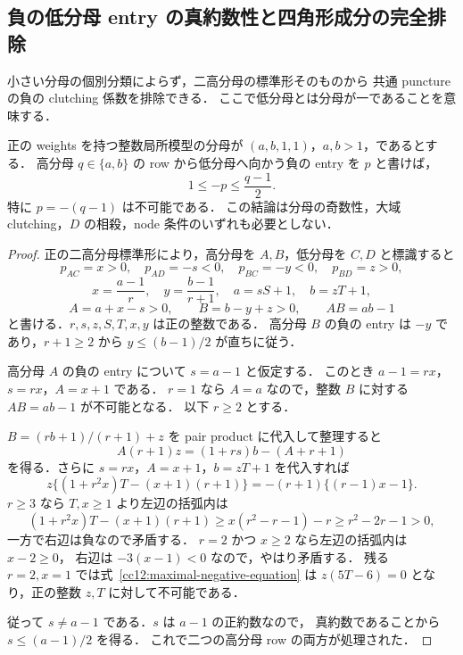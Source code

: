 
\subsection{負の低分母 entry の真約数性と四角形成分の完全排除}
\label{cc12:section}

小さい分母の個別分類によらず，二高分母の標準形そのものから
共通 puncture の負の clutching 係数を排除できる．
ここで低分母とは分母が一であることを意味する．

\begin{lemma}
\label{cc12:proper-negative}
正の weights を持つ整数局所模型の分母が $(a,b,1,1)$，$a,b>1$，であるとする．
高分母 $q\in\{a,b\}$ の row から低分母へ向かう負の entry を $p$ と書けば，
\[
 1\leq -p\leq\frac{q-1}{2}.
\]
特に $p=-(q-1)$ は不可能である．
この結論は分母の奇数性，大域 clutching，$D$ の相殺，node 条件のいずれも必要としない．
\end{lemma}

\begin{proof}
正の二高分母標準形により，高分母を $A,B$，低分母を $C,D$ と標識すると
\[
 p_{AC}=x>0,\quad p_{AD}=-s<0,\quad
 p_{BC}=-y<0,\quad p_{BD}=z>0,
\]
\[
 x=\frac{a-1}{r},\quad y=\frac{b-1}{r+1},\quad
 a=sS+1,\quad b=zT+1,
\]
\[
 A=a+x-s>0,\qquad B=b-y+z>0,\qquad AB=ab-1
\]
と書ける．$r,s,z,S,T,x,y$ は正の整数である．
高分母 $B$ の負の entry は $-y$ であり，$r+1\geq2$ から
$y\leq(b-1)/2$ が直ちに従う．

高分母 $A$ の負の entry について $s=a-1$ と仮定する．
このとき $a-1=rx$，$s=rx$，$A=x+1$ である．
$r=1$ なら $A=a$ なので，整数 $B$ に対する $AB=ab-1$ が不可能となる．
以下 $r\geq2$ とする．

$B=(rb+1)/(r+1)+z$ を pair product に代入して整理すると
\[
 A(r+1)z=(1+rs)b-(A+r+1)
\]
を得る．さらに $s=rx$，$A=x+1$，$b=zT+1$ を代入すれば
\begin{equation}\label{cc12:maximal-negative-equation}
 z\{(1+r^2x)T-(x+1)(r+1)\}
 =-(r+1)\{(r-1)x-1\}.
\end{equation}
$r\geq3$ なら $T,x\geq1$ より左辺の括弧内は
\[
 (1+r^2x)T-(x+1)(r+1)
 \geq x(r^2-r-1)-r
 \geq r^2-2r-1>0,
\]
一方で右辺は負なので矛盾する．
$r=2$ かつ $x\geq2$ なら左辺の括弧内は $x-2\geq0$，
右辺は $-3(x-1)<0$ なので，やはり矛盾する．
残る $r=2,x=1$ では式~\eqref{cc12:maximal-negative-equation} は
$z(5T-6)=0$ となり，正の整数 $z,T$ に対して不可能である．

従って $s\ne a-1$ である．$s$ は $a-1$ の正約数なので，
真約数であることから $s\leq(a-1)/2$ を得る．
これで二つの高分母 row の両方が処理された．
\end{proof}

